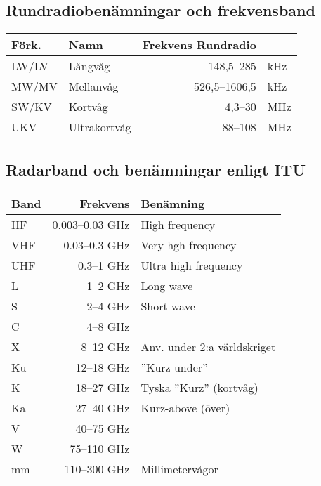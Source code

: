 \subsection{Rundradiobenämningar och frekvensband}

\begin{tabular}{llrl}
\textbf{Förk.} & \textbf{Namn} & \textbf{Frekvens Rundradio} &     \\ \hline
LW/LV          & Långvåg       & 148,5--285                  & kHz \\
MW/MV          & Mellanvåg     & 526,5--1606,5               & kHz \\
SW/KV          & Kortvåg       & 4,3--30                     & MHz \\
UKV            & Ultrakortvåg  & 88--108                     & MHz \\
\end{tabular}

\subsection{Radarband och benämningar enligt ITU}

\begin{tabular}{lrl}
	\textbf{Band} & \textbf{Frekvens} & \textbf{Benämning}          \\ \hline
	HF            &   0.003--0.03 GHz & High frequency              \\
	VHF           &     0.03--0.3 GHz & Very hgh frequency          \\
	UHF           &        0.3--1 GHz & Ultra high frequency        \\
	L             &          1--2 GHz & Long wave                   \\
	S             &          2--4 GHz & Short wave                  \\
	C             &          4--8 GHz &  \\
	X             &         8--12 GHz & Anv. under 2:a världskriget \\
	Ku            &        12--18 GHz & ''Kurz under''              \\
	K             &        18--27 GHz & Tyska ''Kurz'' (kortvåg)    \\
	Ka            &        27--40 GHz & Kurz-above (över)           \\
	V             &        40--75 GHz &  \\
	W             &       75--110 GHz &  \\
	mm            &      110--300 GHz & Millimetervågor
\end{tabular}

